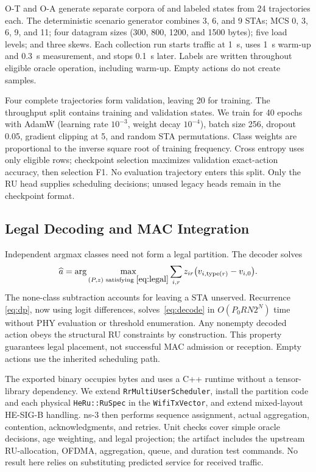 \documentclass[lettersize,journal]{IEEEtran}
\begin{document}
O-T and O-A generate separate corpora of \TRows{} and \ARows{} labeled
states from 24 trajectories each. The deterministic scenario generator
combines 3, 6, and 9 STAs; MCS 0, 3, 6, 9, and 11; four datagram sizes
(300, 800, 1200, and 1500 bytes); five load levels; and three skews.
Each collection run starts traffic at 1~s, uses 1~s warm-up and 0.3~s
measurement, and stops 0.1~s later. Labels are written throughout eligible
oracle operation, including warm-up. Empty actions do not create samples.

Four complete trajectories form validation, leaving 20 for training.
The throughput split contains \TTrainRows{} training and \TValidationRows{}
validation states. We train for 40 epochs with AdamW (learning rate
$10^{-3}$, weight decay $10^{-4}$), batch size 256, dropout 0.05, gradient
clipping at 5, and random STA permutations. Class weights are proportional
to the inverse square root of training frequency. Cross entropy uses only
eligible rows; checkpoint selection maximizes validation exact-action
accuracy, then selection F1. No evaluation trajectory enters this split.
Only the RU head supplies scheduling decisions; unused legacy heads remain
in the checkpoint format.

\subsection{Legal Decoding and MAC Integration}
Independent argmax classes need not form a legal partition. The decoder solves
\begin{equation}
 \widehat a=\arg\max_{(P,z)\text{ satisfying }\eqref{eq:legal}}
   \sum_{i,r}z_{ir}\big(v_{i,\operatorname{type}(r)}-v_{i,0}\big).
 \label{eq:decode}
\end{equation}
The none-class subtraction accounts for leaving a STA unserved. Recurrence
\eqref{eq:dp}, now using logit differences, solves~\eqref{eq:decode} in
$O(P_0RN2^N)$ time without PHY evaluation or threshold enumeration. Any
nonempty decoded action obeys the structural RU constraints by construction.
This property guarantees legal placement, not successful MAC admission or
reception. Empty actions use the inherited scheduling path.

The exported binary occupies \ModelBytes{} bytes and uses a C++ runtime
without a tensor-library dependency. We extend
\texttt{RrMultiUserScheduler}, install the partition code and each physical
\texttt{HeRu::RuSpec} in the \texttt{WifiTxVector}, and extend mixed-layout
HE-SIG-B handling. ns-3 then performs sequence assignment, actual aggregation,
contention, acknowledgments, and retries. Unit checks cover simple oracle
decisions, age weighting, and legal projection; the artifact includes the
upstream RU-allocation, OFDMA, aggregation, queue, and duration test commands.
No result here relies on substituting predicted service for received traffic.
\end{document}

